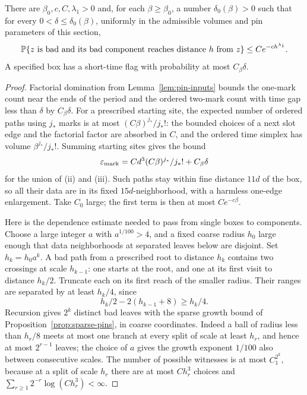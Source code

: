 \begin{lemma}\label{lem:bad-box-tail}
There are $\beta_0,c,C,\lambda_1>0$ and, for each
$\beta\ge\beta_0$, a number $\delta_0(\beta)>0$ such that for
every $0<\delta\le\delta_0(\beta)$, uniformly in the admissible
volumes and pin parameters of this section,
\begin{equation}\label{eq:bad-box-tail}
 \mathbb P\{z\text{ is bad and its bad component reaches distance }h
          \text{ from }z\}
 \le C e^{-ch^{\lambda_1}}.
\end{equation}
A specified box has a short-time flag with probability at most
$C_\beta\delta$.
\end{lemma}

\begin{proof}
Factorial domination from Lemma~\ref{lem:pin-inputs} bounds the
one-mark count near the ends of the period and the ordered two-mark
count with time gap less than $\delta$ by $C_\beta\delta$.
For a prescribed starting site, the expected number of ordered
paths using $j_*$ marks is at most $(C\beta)^{j_*}/j_*!$: the
bounded choices of a next slot edge and the factorial factor are
absorbed in $C$, and the ordered time simplex has volume
$\beta^{j_*}/j_*!$.  Summing starting sites gives the bound
\begin{equation}\label{eq:coarse-mark-cost}
 \varepsilon_{\rm mark}
 =Cd^3(C\beta)^{j_*}/j_*!+C_\beta\delta
\end{equation}
for the union of (ii) and (iii).  Such paths stay within fine
distance $11d$ of the box, so all their data are in its fixed
$15d$-neighborhood, with a harmless one-edge enlargement.
Take $C_0$ large; the first term is then at most $Ce^{-c\beta}$.

Here is the dependence estimate needed to pass from single boxes
to components.  Choose a large integer $a$ with $a^{1/100}>4$,
and a fixed coarse radius $h_0$ large enough that data neighborhoods
at separated leaves below are disjoint.  Set $h_k=h_0a^k$.
A bad path from a prescribed root to distance $h_k$ contains two
crossings at scale $h_{k-1}$: one starts at the root, and one at
its first visit to distance $h_k/2$.  Truncate each on its first
reach of the smaller radius.  Their ranges are separated by at
least $h_k/4$, since
\[
 h_k/2-2(h_{k-1}+8)\ge h_k/4.
\]
Recursion gives $2^k$ distinct bad leaves with the sparse growth
bound of Proposition~\ref{prop:sparse-pins}, in coarse coordinates.
Indeed a ball of radius less than $h_r/8$ meets at most one branch
at every split of scale at least $h_r$, and hence at most
$2^{r-1}$ leaves; the choice of $a$ gives the growth exponent
$1/100$ also between consecutive scales.  The number of possible
witnesses is at most $C_1^{2^k}$, because at a split of scale $h_r$
there are at most $Ch_r^3$ choices and
$\sum_{r\ge1}2^{-r}\log(Ch_r^3)<\infty$.


\end{proof}
